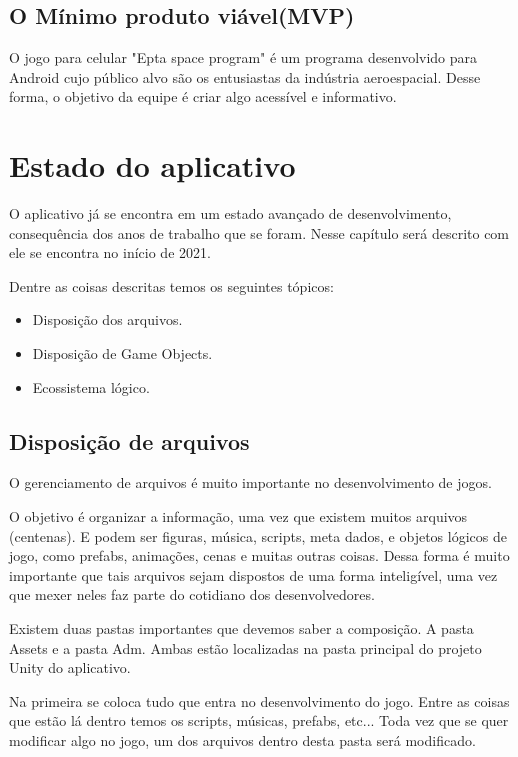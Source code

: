 \section{O Mínimo produto viável(MVP)}

    O jogo para celular "Epta space program" é um programa desenvolvido para Android cujo público alvo são os entusiastas da indústria aeroespacial. Desse forma, o objetivo da equipe é criar algo acessível e informativo.

\chapter{Estado do aplicativo}
    
    O aplicativo já se encontra em um estado avançado de desenvolvimento, consequência dos anos de trabalho que se foram.
    Nesse capítulo será descrito com ele se encontra no início de 2021. 
    
    Dentre as coisas descritas temos os seguintes tópicos:

    \begin{itemize}
        \item Disposição dos arquivos.
        \item Disposição de Game Objects.
        \item Ecossistema lógico.
    \end{itemize}

    \section{Disposição de arquivos}

    O gerenciamento de arquivos é muito importante no desenvolvimento de jogos.

    O objetivo é organizar a informação, uma vez que existem muitos arquivos (centenas). E podem ser figuras, música, scripts, meta dados, e objetos lógicos de jogo, como prefabs, animações, cenas e muitas outras coisas.
    Dessa forma é muito importante que tais arquivos sejam dispostos de uma forma inteligível, uma vez que mexer neles faz parte do cotidiano dos desenvolvedores.
        
    Existem duas pastas importantes que devemos saber a composição. A pasta Assets e a pasta Adm. Ambas estão localizadas na pasta principal do projeto Unity do aplicativo. 

    Na primeira se coloca tudo que entra no desenvolvimento do jogo. Entre as coisas que estão lá dentro temos os scripts, músicas, prefabs, etc... Toda vez que se quer modificar algo no jogo, um dos arquivos dentro desta pasta será modificado.

